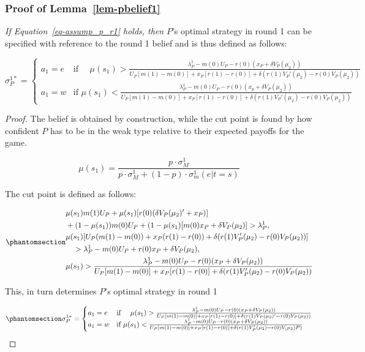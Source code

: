 \documentclass[
  12pt,
]{article}
\theoremstyle{plain}
\theoremstyle{plain}
\theoremstyle{remark}
\begin{document}
\subsubsection{\texorpdfstring{Proof of
Lemma~\ref{lem-pbelief1}}{Proof of Lemma~}}\label{proof-of-lem-pbelief1}

\emph{If Equation~\ref{eq-assump_p_r1} holds, then} \(P\)'s optimal
strategy in round 1 can be specified with reference to the round 1
belief and is thus defined as follows:

\[
\sigma^{1*}_P = 
\begin{cases}
a_1= e  & \text{if } \quad\mu(s_1)
> \frac{\lambda^1_P - m(0)U_P - r(0)(x_P + \delta V_P(\mu_2))}
 {U_P[ m(1) - m(0) ]+ x_P [r(1) -r(0)] 
 + \delta (r(1)V_P'(\mu_2) - r(0)V_P(\mu_2))}\\
a_1 = w  & \text{if } \mu(s_1)
< \frac{\lambda^1_P - m(0)U_P - r(0)(x_p + \delta V_P(\mu_2))}
 {U_P[ m(1) - m(0) ]+ x_P [r(1) -r(0)] 
 + \delta (r(1)V_P'(\mu_2) - r(0)V_P(\mu_2))}
\end{cases}
\]

\begin{proof}
The belief is obtained by construction, while the cut point is found by
how confident \(P\) has to be in the weak type relative to their
expected payoffs for the game.

\[
\mu(s_1) = \frac{p \cdot \sigma^1_M}{p \cdot \sigma^1_M + (1 - p) \cdot \sigma^1_m(e|t = s)}
\]

The cut point is defined as follows:

\begin{equation}\phantomsection\label{eq-beliefr1}{
\begin{aligned}
&\mu(s_1) m(1) U_P
+ \mu(s_1)[r(0)(\delta V_P(\mu_2)' + x_P)] \\
&+ (1 - \mu(s_1)) m(0) U_P 
+ (1 - \mu(s_1) [m(0) x_P + \delta V_P(\mu_2)] > \lambda^1_P, \\
&\mu(s_1)[U_P (m(1)- m(0)) 
+ x_P(r(1) - r(0)) 
+ \delta (r(1)V_P'(\mu_2) - r(0)V_P(\mu_2))] \\
&\quad > \lambda^1_P - m(0)U_P 
+ r(0) x_P + \delta V_P(\mu_2), \\
& \mu(s_1)
> \frac{\lambda^1_P - m(0)U_P - r(0)(x_P + \delta V_P(\mu_2))}
 {U_P[ m(1) - m(0) ]+ x_P [r(1) -r(0)] 
 + \delta (r(1)V_P'(\mu_2) - r(0)V_P(\mu_2))}
\end{aligned}
}\end{equation}

This, in turn determines \(P\)'s optimal strategy in round 1

\begin{equation}\phantomsection\label{eq-stratp}{
\sigma^{1*}_P = 
\begin{cases}
a_1= e  & \text{if } \quad\mu(s_1)
> \frac{\lambda^1_P - m(0)U_P - r(0)(x_P + \delta V_P(\mu_2))}
 {U_P[ m(1) - m(0) ]+ x_P [r(1) -r(0)] 
 + \delta (r(1)V_P(\mu_2)' - r(0)V_P(\mu_2))}\\
a_1 = w  & \text{if } \mu(s_1)
< \frac{\lambda^1_P - m(0)U_P - r(0)(x_P + \delta V_P(\mu_2))}
 {U_P[ m(1) - m(0) ]+ x_P [r(1) -r(0)] 
 + \delta (r(1)V_P'(\mu_2) - r(0)V_(\mu_2)P)}
\end{cases}
}\end{equation}
\end{proof}
\end{document}

